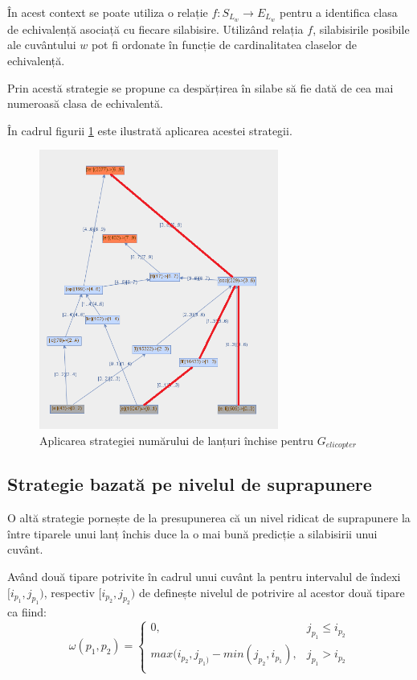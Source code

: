 În acest context se poate utiliza o relație $f: S_{L_w} \rightarrow E_{L_w}$ pentru a identifica clasa de echivalență asociață cu fiecare silabisire. Utilizând relația $f$, silabisirile posibile ale cuvântului $w$ pot fi ordonate în funcție de cardinalitatea claselor de echivalență. 

Prin acestă strategie se propune ca despărțirea în silabe să fie dată de cea mai numeroasă clasa de echivalentă.

\begin{ex}
În cadrul figurii \ref{fig:rosil-counting} este ilustrată aplicarea acestei strategii. 
\end{ex}

\begin{figure}[h!]
    \centering
    \includegraphics[width=0.7\textwidth]{figures/rosil-counting.png}
    \caption{Aplicarea strategiei numărului de lanțuri închise pentru $G_{elicopter}$}
    \label{fig:rosil-counting}
\end{figure}

\subsection{Strategie bazată pe nivelul de suprapunere}

O altă strategie pornește de la presupunerea că un nivel ridicat de suprapunere la între tiparele unui lanț închis duce la o mai bună predicție a silabisirii unui cuvânt.

\begin{defi}
Având două tipare potrivite în cadrul unui cuvânt la pentru intervalul de îndexi $[i_{p_1}, j_{p_1})$, respectiv $[i_{p_2}, j_{p_2})$ de definește nivelul de potrivire al acestor două tipare ca fiind:
\begin{equation}
\omega(p_1, p_2) = \left\{
\begin{matrix}
0, 					& j_{p_1} \leq i_{p_2}\\ 
max(i_{p_2},j_{p_1)} - min(j_{p_2},i_{p_1}),	& j_{p_1} > i_{p_2} \\
\end{matrix}
\right.
\end{equation}
\end{defi}

